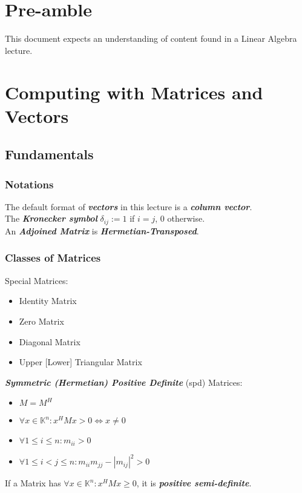 \documentclass[12pt]{article}
\author{\authorVar}
\title{\titleVar}
\date{\dateVar}
\newcommand{\tocr}{
\renewcommand\cftaftertoctitle{\par\noindent\hrulefill\par\vskip-0.65em}
\tableofcontents
\noindent\hrulefill
}
\begin{document}
    
    
\maketitle

\tocr

\thispagestyle{fancy}
\section*{Pre-amble} %
This document expects an understanding of content found in a Linear Algebra lecture.
\section{Computing with Matrices and Vectors}
\subsection{Fundamentals}
\subsubsection{Notations}
The default format of \textit{\textbf{vectors}} in this lecture is a \textit{\textbf{column vector}}.\\
The \textit{\textbf{Kronecker symbol}} $\delta_{ij} := 1$ if $i=j$, 0 otherwise.\\
An \textit{\textbf{Adjoined Matrix}} is \textit{\textbf{Hermetian-Transposed}}.
\subsubsection{Classes of Matrices}
Special Matrices:
\begin{itemize}
\item Identity Matrix
\item Zero Matrix
\item Diagonal Matrix
\item Upper [Lower] Triangular Matrix
\end{itemize}
\textit{\textbf{Symmetric (Hermetian) Positive Definite}} (spd) Matrices:
\begin{itemize}
\item $M = M^H$
\item $\forall x \in \mathbb{K}^n: x^HMx > 0 \iff x \neq 0$
\item $\forall 1 \leq i \leq n : m_{ii} > 0$
\item $\forall 1 \leq i < j \leq n: m_{ii}m_{jj} - |m_{ij}|^2 > 0$
\end{itemize}
If a Matrix has $\forall x \in \mathbb{K}^n: x^HMx \geq 0$, it is \textit{\textbf{positive semi-definite}}.
\end{document}
